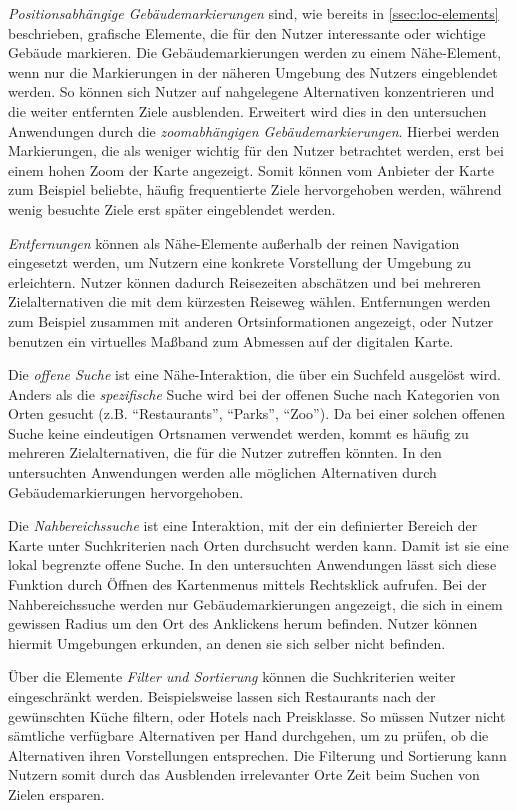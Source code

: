 \emph{Positionsabhängige Gebäudemarkierungen} sind, wie bereits in \autoref{ssec:loc-elements} beschrieben, grafische Elemente, die für den Nutzer interessante oder wichtige Gebäude markieren.
Die Gebäudemarkierungen werden zu einem Nähe-Element, wenn nur die Markierungen in der näheren Umgebung des Nutzers eingeblendet werden.
So können sich Nutzer auf nahgelegene Alternativen konzentrieren und die weiter entfernten Ziele ausblenden.
Erweitert wird dies in den untersuchen Anwendungen durch die \emph{zoomabhängigen Gebäudemarkierungen}.
Hierbei werden Markierungen, die als weniger wichtig für den Nutzer betrachtet werden, erst bei einem hohen Zoom der Karte angezeigt.
Somit können vom Anbieter der Karte zum Beispiel beliebte, häufig frequentierte Ziele hervorgehoben werden, während wenig besuchte Ziele erst später eingeblendet werden.

\emph{Entfernungen} können als Nähe-Elemente außerhalb der reinen Navigation eingesetzt werden, um Nutzern eine konkrete Vorstellung der Umgebung zu erleichtern.
Nutzer können dadurch Reisezeiten abschätzen und bei mehreren Zielalternativen die mit dem kürzesten Reiseweg wählen.
Entfernungen werden zum Beispiel zusammen mit anderen Ortsinformationen angezeigt, oder Nutzer benutzen ein virtuelles Maßband zum Abmessen auf der digitalen Karte.

Die \emph{offene Suche} ist eine Nähe-Interaktion, die über ein Suchfeld ausgelöst wird.
Anders als die \emph{spezifische} Suche wird bei der offenen Suche nach Kategorien von Orten gesucht (z.B. \enquote{Restaurants}, \enquote{Parks}, \enquote{Zoo}).
Da bei einer solchen offenen Suche keine eindeutigen Ortsnamen verwendet werden, kommt es häufig zu mehreren Zielalternativen, die für die Nutzer zutreffen könnten.
In den untersuchten Anwendungen werden alle möglichen Alternativen durch Gebäudemarkierungen hervorgehoben.

Die \emph{Nahbereichssuche} ist eine Interaktion, mit der ein definierter Bereich der Karte unter Suchkriterien nach Orten durchsucht werden kann.
Damit ist sie eine lokal begrenzte offene Suche.
In den untersuchten Anwendungen lässt sich diese Funktion durch Öffnen des Kartenmenus mittels Rechtsklick aufrufen.
Bei der Nahbereichssuche werden nur Gebäudemarkierungen angezeigt, die sich in einem gewissen Radius um den Ort des Anklickens herum befinden.
Nutzer können hiermit Umgebungen erkunden, an denen sie sich selber nicht befinden.

Über die Elemente \emph{Filter und Sortierung} können die Suchkriterien weiter eingeschränkt werden.
Beispielsweise lassen sich Restaurants nach der gewünschten Küche filtern, oder Hotels nach Preisklasse.
So müssen Nutzer nicht sämtliche verfügbare Alternativen per Hand durchgehen, um zu prüfen, ob die Alternativen ihren Vorstellungen entsprechen.
Die Filterung und Sortierung kann Nutzern somit durch das Ausblenden irrelevanter Orte Zeit beim Suchen von Zielen ersparen.


